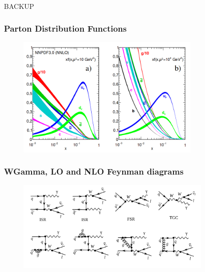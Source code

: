 \begin{frame}
  \HUGE
  BACKUP
\end{frame}

\begin{frame}\frametitle{Parton Distribution Functions}
  \begin{figure}[htb]
    \begin{center}
       \includegraphics[width=0.80\textwidth]{../figs/Intro/pdfs.png} 
    \end{center}
  \end{figure}
\end{frame}%

\begin{frame}\frametitle{WGamma, LO and NLO Feynman diagrams}
  \begin{figure}[htb]
    \begin{center}
       \includegraphics[width=0.85\textwidth]{../figs/WgAbout/feynmWg_LO_NLO.png} 
    \end{center}
  \end{figure}
\end{frame}%

